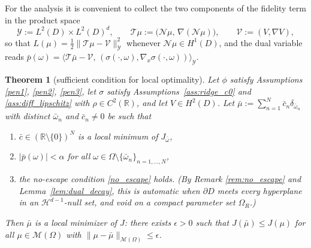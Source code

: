 \documentclass[11pt]{amsart}
\newtheorem{theorem}{Theorem}[section]
\theoremstyle{definition}
\theoremstyle{remark}
\begin{document}
For the analysis it is convenient to collect the two components of the fidelity term in the product space
\begin{equation*}
	\mathcal{Y} := L^2(D) \times L^2(D)^d, \qquad
	\mathcal{T}\mu := \big(\mathcal{N}\mu, \, \nabla(\mathcal{N}\mu)\big), \qquad
	\mathcal{V} := (V, \nabla V),
\end{equation*}
so that $L(\mu) = \frac{1}{2}\|\mathcal{T}\mu - \mathcal{V}\|_{\mathcal{Y}}^2$
whenever $\mathcal{N}\mu \in H^1(D)$, and the dual variable reads
$\bar{p}(\omega) = \langle \mathcal{T}\bar{\mu} - \mathcal{V}, \,
(\sigma(\cdot,\omega), \nabla_x \sigma(\cdot,\omega)) \rangle_{\mathcal{Y}}$.

\begin{theorem}[sufficient condition for local optimality]
\label{sc_opt}
Let $\phi$ satisfy Assumptions \ref{pen1}, \ref{pen2}, \ref{pen3}, let $\sigma$
satisfy Assumptions~\ref{ass:ridge_c0} and \ref{ass:diff_lipschitz} with
$\rho \in C^2(\mathbb{R})$, and let $V \in H^2(D)$. Let $\bar{\mu} := \sum_{n = 1}^N \bar{c}_n \delta_{\bar{\omega}_n}$
with distinct $\bar{\omega}_n$ and $\bar{c}_n \neq 0$ be such that
\begin{enumerate}
	\item $\bar{c} \in (\mathbb{R} \setminus \{0\})^N$ is a local minimum of $J_{\bar{\omega}}$,
	\item $|\bar{p}(\omega)| < \alpha$ for all $\omega \in \Omega \setminus \{\bar{\omega}_n \}_{n = 1, \dots, N}$,
	\item the no-escape condition \eqref{no_escape} holds. (By Remark
	\ref{rem:no_escape} and Lemma~\ref{lem:dual_decay}, this is automatic
	when $\partial D$ meets every hyperplane in an $\mathcal{H}^{d-1}$-null
	set, and void on a compact parameter set $\Omega_R$.)
\end{enumerate}
Then $\bar{\mu}$ is a local minimizer of $J$: there exists $\epsilon > 0$ such
that $J(\bar{\mu}) \le J(\mu)$ for all $\mu \in \mathcal{M}(\Omega)$ with
$\|\mu - \bar{\mu}\|_{\mathcal{M}(\Omega)} \le \epsilon$.
\end{theorem}
\end{document}
